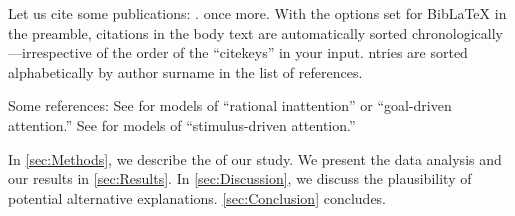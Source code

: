 Let us cite some publications: \cite{Andersen2008, Andreoni2012, Balakrishnan2016, Koszegi2013}. \cite{Andersen2008} once more. With the options set for BibLaTeX in the preamble, citations in the body text are automatically sorted chronologically---irrespective of the order of the ``citekeys'' in your input. ntries are sorted alphabetically by author surname in the list of references.

\Blindtext[3]

Some references: See \cite{Sims2003, Gabaix2014} for models of ``rational inattention'' or ``goal-driven attention.'' See \cite{Bordalo2012, Bordalo2013, Koszegi2013, Taubinsky2014, Bushong2016} for models of ``stimulus-driven attention.''

\blindmathtrue

\Blindtext[3]

In \autoref{sec:Methods}, we describe the  of our study. We present the data analysis and our results in \autoref{sec:Results}. In \autoref{sec:Discussion}, we discuss the plausibility of potential alternative explanations. \autoref{sec:Conclusion} concludes.